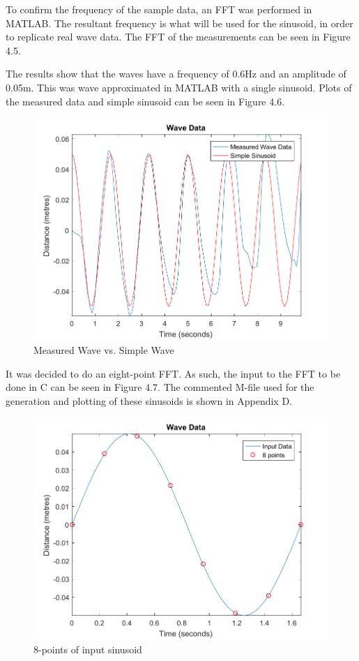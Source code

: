 \documentclass[12pt,a4paper]{report} %
\begin{document}
To confirm the frequency of the sample data, an FFT was performed in MATLAB.
The resultant frequency is what will be used for the sinusoid, in order to replicate real wave data.
The FFT of the measurements can be seen in Figure 4.5.

The results show that the waves have a frequency of 0.6Hz and an amplitude of 0.05m.
This was wave approximated in MATLAB with a single sinusoid.
Plots of the measured data and simple sinusoid can be seen in Figure 4.6.
\begin{figure}[ht]
\centerline{\includegraphics[scale=0.6]{diagrams/wave3}}
\caption{Measured Wave vs. Simple Wave}
\end{figure}

It was decided to do an eight-point FFT.
As such, the input to the FFT to be done in C can be seen in Figure 4.7.
The commented M-file used for the generation and plotting of these sinusoids is shown in Appendix D.
\begin{figure}[ht]
\centerline{\includegraphics[scale=0.6]{diagrams/wave4}}
\caption{8-points of input sinusoid}
\end{figure}
\end{document}
